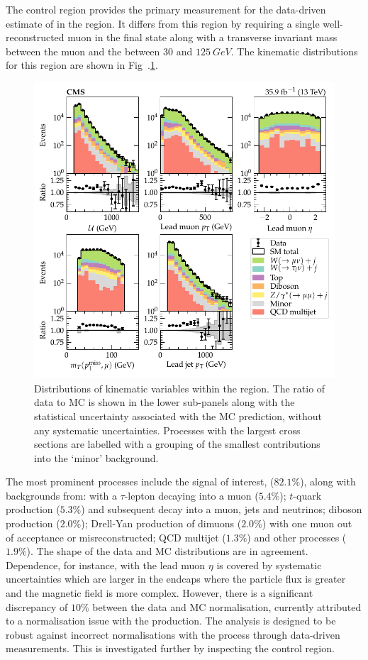 The \muplusjets control region provides the primary measurement for the data-driven estimate of \IWlv in the \metplusjets region. It differs from this region by requiring a single well-reconstructed muon in the final state along with a transverse invariant mass between the muon and the \ptmiss between $30$ and $\SI{125}{GeV}$. The kinematic distributions for this region are shown in Fig~.\ref{fig:muplusjets}.
%
\begin{figure}[htb]
    \centering
    \includegraphics{chapters/042_backgrounds/images/singlemuon_dists.pdf}
    \caption[Single muon final state kinematics.]{
        Distributions of kinematic variables within the \muplusjets region. The ratio of data to MC is shown in the lower sub-panels along with the statistical uncertainty associated with the MC prediction, without any systematic uncertainties. Processes with the largest cross sections are labelled with a grouping of the smallest contributions into the `minor' background.
    }
    \label{fig:muplusjets}
\end{figure}
%
The most prominent processes include the signal of interest, \IWmvj ($82.1\%$), along with backgrounds from: \IWlv with a $\tau$-lepton decaying into a muon ($5.4\%$); $t$-quark production ($5.3\%$) and subsequent decay into a muon, jets and neutrinos; diboson production ($2.0\%$); Drell-Yan production of dimuons ($2.0\%$) with one muon out of acceptance or misreconstructed; QCD multijet ($1.3\%$) and other processes ($1.9\%$). The shape of the data and MC distributions are in agreement. Dependence, for instance, with the lead muon $\eta$ is covered by systematic uncertainties which are larger in the endcaps where the particle flux is greater and the magnetic field is more complex. However, there is a significant discrepancy of $10\%$ between the data and MC normalisation, currently attributed to a normalisation issue with the \IWj production. The analysis is designed to be robust against incorrect normalisations with the \IVj process through data-driven measurements. This is investigated further by inspecting the \eleplusjets control region.


